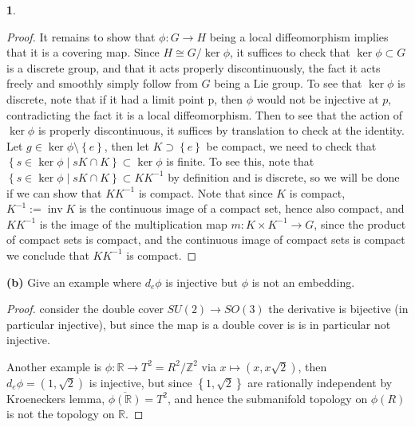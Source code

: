 \documentclass[10.5pt]{article}
\theoremstyle{definition}
\newtheorem{pb}{}
\newcommand{\set}[1]{\left\{#1\right\}}
\newcommand{\inv}{\operatorname{inv}}
\begin{document}
\begin{pb}
\begin{proof}
            It remains to show that \(\phi: G \to H\) being a local diffeomorphism implies that it is a covering map. Since \(H \cong G/\ker\phi\), it suffices to check that \(\ker\phi \subset G\) is a discrete group, and that it acts properly discontinuously, the fact it acts freely and smoothly simply follow from \(G\) being a Lie group. To see that \(\ker \phi\) is discrete, note that if it had a limit point p, then \(\phi\) would not be injective at \(p\), contradicting the fact it is a local diffeomorphism. Then to see that the action of \(\ker \phi\) is properly discontinuous, it suffices by translation to check at the identity. Let \(g \in \ker \phi \setminus \set{e}\), then let \(K \supset \set{e}\) be compact, we need to check that \(\set{s \in \ker \phi \mid sK \cap K} \subset \ker \phi\) is finite. To see this, note that \(\set{s \in \ker \phi \mid sK \cap K} \subset KK^{-1}\) by definition and is discrete, so we will be done if we can show that \(KK^{-1}\) is compact. Note that since \(K\) is compact, \(K^{-1} := \inv K\) is the continuous image of a compact set, hence also compact, and \(KK^{-1}\) is the image of the multiplication map \(m: K \times K^{-1} \to G\), since the product of compact sets is compact, and the continuous image of compact sets is compact we conclude that \(KK^{-1}\) is compact.
        \end{proof}


        \textbf{(b)} Give an example where \(d_e \phi\) is injective but \(\phi\) is not an embedding.

        \begin{proof}
            consider the double cover \(SU(2) \to SO(3)\) the derivative is bijective (in particular injective), but since the map is a double cover is is in particular not injective.

            Another example is \(\phi: \mathbb{R} \to T^2 = R^2/\mathbb{Z}^2\) via \(x \mapsto (x,x\sqrt{2})\), then \(d_e \phi = (1,\sqrt{2})\) is injective, but since \(\set{1,\sqrt{2}}\) are rationally independent by Kroeneckers lemma, \(\overline{\phi(\mathbb{R})} = T^2\), and hence the submanifold topology on \(\phi(R)\) is not the topology on \(\mathbb{R}\).
        \end{proof}
    \end{pb}
\end{document}
